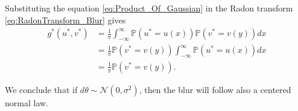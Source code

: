 \documentclass{article}
\begin{document}
Substituting the equation \eqref{eq:Product_Of_Gaussian} in the Radon transform \eqref{eq:RadonTransform_Blur} gives
\begin{align}
    g^*(u^*, v^*) &= \frac{1}{\pi} \int_{-\infty}^{\infty} \mathbb{P}(u^* = u(x)) \mathbb{P}(v^* = v(y)) dx \\
                   &= \frac{1}{\pi} \mathbb{P}(v^* = v(y)) \int_{-\infty}^{\infty} \mathbb{P}(u^* = u(x)) dx \\
                   &= \frac{1}{\pi} \mathbb{P}(v^* = v(y)).
\end{align}

We conclude that if $d\theta \sim \mathcal{N}(0, \sigma^2)$, then the blur will follow also a centered normal law.
\end{document}
